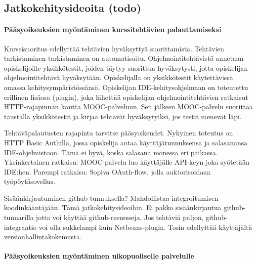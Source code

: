 \documentclass[finnish,gradu]{tktltiki}
\begin{document}

  \subsection{Jatkokehitysideoita (todo)} %
  \label{sub:jatkokehitysideoita}

  \paragraph{Pääsyoikeuksien myöntäminen kurssitehtävien palauttamiseksi} \hfill %
  \label{par:pääsyoikeuksien_myöntäminen_ohjelmakoodin_palauttamiseksi}

    Kurssisuoritus edellyttää tehtävien hyväksyttyä suorittamista. Tehtävien tarkistaminen tarkistaminen on automatisoitu. Ohjelmointitehtävistä annetaan opiskelijoille yksikkötestit, joiden täytyy suorittua hyväksytysti, jotta opiskelijan ohjelmointitehtävä hyväksytään. Opiskelijalla on yksikkötestit käytettävissä omassa kehitysympäristössänsä. Opiskelijan IDE-kehitysohjelmaan on toteutettu erillinen lisäosa (plugin), joka lähettää opiskelijan ohjelmointitehtävien ratkaisut HTTP-rajapinnan kautta MOOC-palveluun. Sen jälkeen MOOC-palvelu suorittaa taustalla yksikkötestit ja kirjaa tehtävät hyväksytyiksi, jos testit menevät läpi.

    Tehtäväpalautusten rajapinta tarvitse pääsyoikeudet. Nykyinen toteutus on HTTP Basic Authilla, jossa opiskelija antaa käyttäjätunnuksensa ja salasanansa IDE-ohjelmistoon. Tämä ei hyvä, koska salasana monessa eri paikassa. Yksinkertainen ratkaisu: MOOC-palvelu luo käyttäjälle API-keyn joka syötetään IDE:hen. Parempi ratkaisu: Sopiva OAuth-flow, jolla auktorisoidaan työpöytäsovellus.

    Sisäänkirjautuminen github-tunnuksella? Mahdollistaa integroitumisen koodinkääntäjään. Tämä jatkokehitysideoihin. Ei pakko sisäänkirjautua github-tunnarilla jotta voi käyttää github-resursseja. Jos tehtäviä paljon, github-integraatio voi olla sukkelampi kuin Netbeans-plugin. Tosin edellyttää käyttäjältä versionhallintakokemusta.


  \paragraph{Pääsyoikeuksien myöntäminen ulkopuoliselle palvelulle} \hfill %
  \label{par:pääsyoikeuksien_myöntäminen_ulkopuoliselle_palvelulle}
\end{document}
